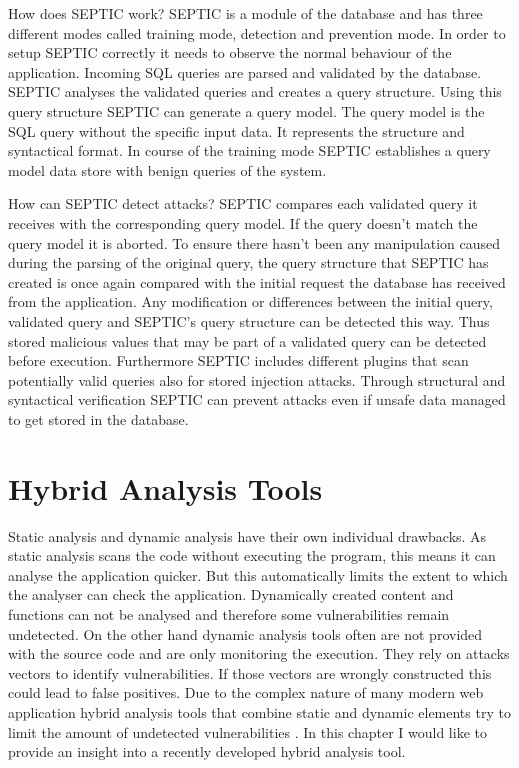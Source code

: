 How does SEPTIC work? SEPTIC is a module of the database and has three different modes called training mode, detection and prevention mode. In order to setup SEPTIC correctly it needs to observe the normal behaviour of the application. Incoming SQL queries are parsed and validated by the database. SEPTIC analyses the validated queries and creates a query structure. Using this query structure SEPTIC can generate a query model. The query model is the SQL query without the specific input data. It represents the structure and syntactical format. In course of the training mode SEPTIC establishes a query model data store with benign queries of the system\autocite[1169-1172]{Medeiros2019}.\newline


How can SEPTIC detect attacks? SEPTIC compares each validated query it receives with the corresponding query model. If the query doesn't match the query model it is aborted. To ensure there hasn't been any manipulation caused during the parsing of the original query, the query structure that SEPTIC has created is once again compared with the initial request the database has received from the application. Any modification or differences between the initial query, validated query and SEPTIC's query structure can be detected this way. Thus stored malicious values that may be part of a validated query can be detected before execution. Furthermore SEPTIC includes different plugins that scan potentially valid queries also for stored injection attacks. Through structural and syntactical verification SEPTIC can prevent attacks even if unsafe data managed to get stored in the database\autocite[1173-1175]{Medeiros2019}.

\section{Hybrid Analysis Tools}
Static analysis and dynamic analysis have their own individual drawbacks. As static analysis scans the code without executing the program, this means it can analyse the application quicker. But this automatically limits the extent to which the analyser can check the application. Dynamically created content and functions can not be analysed and therefore some vulnerabilities remain undetected. On the other hand dynamic analysis tools often are not provided with the source code and are only monitoring the execution. They rely on attacks vectors to identify vulnerabilities. If those vectors are wrongly constructed this could lead to false positives.
Due to the complex nature of many modern web application hybrid analysis tools that combine static and dynamic elements try to limit the amount of undetected vulnerabilities \autocite[]{Araujo2018, Jahanshahi2018}. In this chapter I would like to provide an insight into a recently developed hybrid analysis tool.\newline


